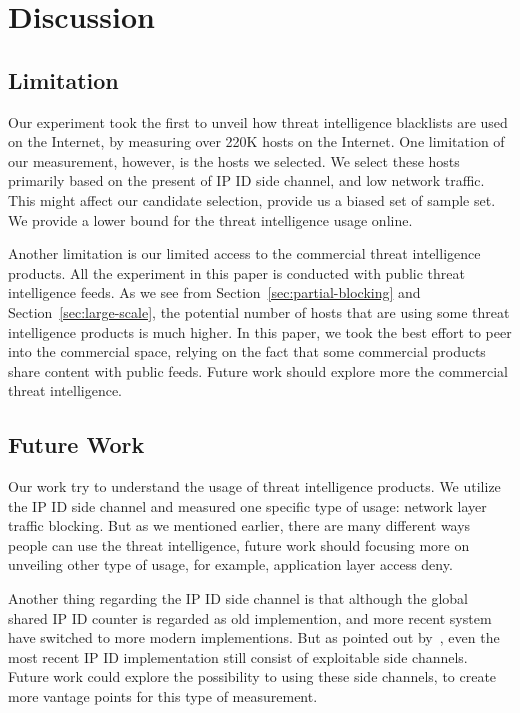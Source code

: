 \section{Discussion}


\subsection{Limitation}
Our experiment took the first to unveil how threat intelligence blacklists are
used on the Internet, by measuring over 220K hosts on the Internet. One
limitation of our measurement, however, is the hosts we selected. We select
these hosts primarily based on the present of IP ID side channel, and low
network traffic. This might affect our candidate selection, provide us a biased
set of sample set. We provide a lower bound for the threat intelligence usage
online.

Another limitation is our limited access to the commercial threat intelligence
products. All the experiment in this paper is conducted with public threat
intelligence feeds. As we see from Section~\ref{sec:partial-blocking} and
Section~\ref{sec:large-scale}, the potential number of hosts that are using
some threat intelligence products is much higher. In this paper, we took the
best effort to peer into the commercial space, relying on the fact that some
commercial products share content with public feeds. Future work should explore
more the commercial threat intelligence.


\subsection{Future Work}
Our work try to understand the usage of threat intelligence products. We utilize
the IP ID side channel and measured one specific type of usage: network layer
traffic blocking. But as we mentioned earlier, there are many different ways
people can use the threat intelligence, future work should focusing more on
unveiling other type of usage, for example, application layer access deny.

Another thing regarding the IP ID side channel is that although the global
shared IP ID counter is regarded as old implemention, and more recent system
have switched to more modern implementions. But as pointed out by~\cite{klein2019ip},
even the most recent IP ID implementation still consist of exploitable side
channels. Future work could explore the possibility to using these side channels,
to create more vantage points for this type of measurement.
